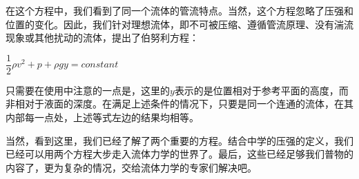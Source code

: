        在这个方程中，我们看到了同一个流体的管流特点。当然，这个方程忽略了压强和位置的变化。因此，我们针对理想流体，即不可被压缩、遵循管流原理、没有湍流现象或其他扰动的流体，提出了伯努利方程：
        \begin{law}
            \centering
            $\dfrac{1}{2}\rho v^2 +p+\rho gy=constant$
        \end{law}

        只需要在使用中注意的一点是，这里的$y$表示的是位置相对于参考平面的高度，而非相对于液面的深度。在满足上述条件的情况下，只要是同一个连通的流体，在其内部每一点处，上述等式左边的结果均相等。

        当然，看到这里，我们已经了解了两个重要的方程。结合中学的压强的定义，我们已经可以用两个方程大步走入流体力学的世界了。最后，这些已经足够我们普物的内容了，更为复杂的情况，交给流体力学的专家们解决吧。
